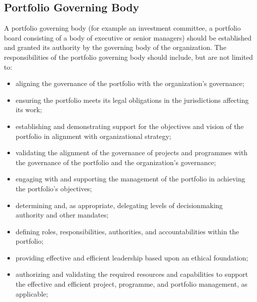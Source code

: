 \documentclass[letterpaper,10pt,english]{jupyterBook}
\begin{document}
\subsection{Portfolio Governing Body}
\label{\detokenize{PM/ppm:portfolio-governing-body}}
\sphinxAtStartPar
A portfolio governing body (for example an investment committee, a portfolio board consisting of a
body of executive or senior managers) should be established and granted its authority by the governing
body of the organization.
The responsibilities of the portfolio governing body should include, but are not limited to:
\begin{itemize}
\item {} 
\sphinxAtStartPar
aligning the governance of the portfolio with the organization’s governance;

\item {} 
\sphinxAtStartPar
ensuring the portfolio meets its legal obligations in the jurisdictions affecting its work;

\item {} 
\sphinxAtStartPar
establishing and demonstrating support for the objectives and vision of the portfolio in alignment with organizational strategy;

\item {} 
\sphinxAtStartPar
validating the alignment of the governance of projects and programmes with the governance of the portfolio and the organization’s governance;

\item {} 
\sphinxAtStartPar
engaging with and supporting the management of the portfolio in achieving the portfolio’s objectives;

\item {} 
\sphinxAtStartPar
determining and, as appropriate, delegating levels of decision\sphinxhyphen{}making authority and other mandates;

\item {} 
\sphinxAtStartPar
defining roles, responsibilities, authorities, and accountabilities within the portfolio;

\item {} 
\sphinxAtStartPar
providing effective and efficient leadership based upon an ethical foundation;

\item {} 
\sphinxAtStartPar
authorizing and validating the required resources and capabilities to support the effective and efficient project, programme, and portfolio management, as applicable;


\end{itemize}
\end{document}
